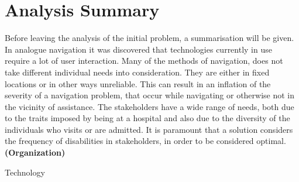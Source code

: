 \section{Analysis Summary} \label{analsum}
Before leaving the analysis of the initial problem, a summarisation will be given. In analogue navigation it was discovered that technologies currently in use require a lot of user interaction. Many of the methods of navigation, does not take different individual needs into consideration. They are either in fixed locations or in other ways unreliable. This can result in an inflation of the severity of a navigation problem, that occur while navigating or otherwise not in the vicinity of assistance. 
The stakeholders have a wide range of needs, both due to the traits imposed by being at a hospital and also due to the diversity of the individuals who visits or are admitted. It is paramount that a solution considers the frequency of disabilities in stakeholders, in order to be considered optimal.
\textbf{(Organization)}


Technology